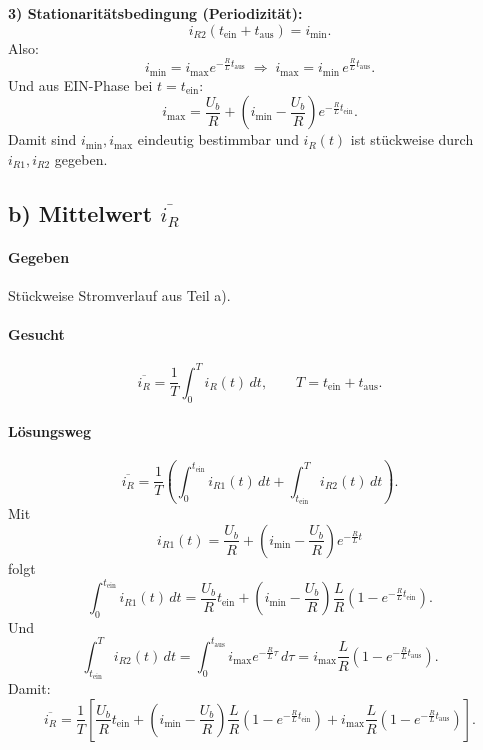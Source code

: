 \textbf{3) Stationaritätsbedingung (Periodizität):}
\[
i_{R2}(t_\mathrm{ein}+t_\mathrm{aus}) = i_\mathrm{min}.
\]
Also:
\[
i_\mathrm{min}=i_\mathrm{max}e^{-\frac{R}{L}t_\mathrm{aus}}
\;\Rightarrow\;
\boxed{
i_\mathrm{max}=i_\mathrm{min}\,e^{\frac{R}{L}t_\mathrm{aus}}
}.
\]
Und aus EIN-Phase bei $t=t_\mathrm{ein}$:
\[
i_\mathrm{max}=\frac{U_b}{R}+\left(i_\mathrm{min}-\frac{U_b}{R}\right)e^{-\frac{R}{L}t_\mathrm{ein}}.
\]
Damit sind $i_\mathrm{min},i_\mathrm{max}$ eindeutig bestimmbar und $i_R(t)$ ist stückweise durch $i_{R1},i_{R2}$ gegeben.


\subsection*{b) Mittelwert $\overline{i_R}$}

\paragraph{Gegeben}
Stückweise Stromverlauf aus Teil a).

\paragraph{Gesucht}
\[
\overline{i_R}=\frac{1}{T}\int_0^T i_R(t)\,dt, \qquad T=t_\mathrm{ein}+t_\mathrm{aus}.
\]

\paragraph{Lösungsweg}
\[
\overline{i_R}=\frac{1}{T}\left(
\int_0^{t_\mathrm{ein}} i_{R1}(t)\,dt + \int_{t_\mathrm{ein}}^{T} i_{R2}(t)\,dt
\right).
\]
Mit
\[
i_{R1}(t)=\frac{U_b}{R}+\left(i_\mathrm{min}-\frac{U_b}{R}\right)e^{-\frac{R}{L}t}
\]
folgt
\[
\int_0^{t_\mathrm{ein}} i_{R1}(t)\,dt
=
\frac{U_b}{R}t_\mathrm{ein}
+
\left(i_\mathrm{min}-\frac{U_b}{R}\right)\frac{L}{R}\left(1-e^{-\frac{R}{L}t_\mathrm{ein}}\right).
\]
Und
\[
\int_{t_\mathrm{ein}}^{T} i_{R2}(t)\,dt
=
\int_0^{t_\mathrm{aus}} i_\mathrm{max}e^{-\frac{R}{L}\tau}\,d\tau
=
i_\mathrm{max}\frac{L}{R}\left(1-e^{-\frac{R}{L}t_\mathrm{aus}}\right).
\]
Damit:
\[
\boxed{
\overline{i_R}=\frac{1}{T}\left[
\frac{U_b}{R}t_\mathrm{ein}
+
\left(i_\mathrm{min}-\frac{U_b}{R}\right)\frac{L}{R}\left(1-e^{-\frac{R}{L}t_\mathrm{ein}}\right)
+
i_\mathrm{max}\frac{L}{R}\left(1-e^{-\frac{R}{L}t_\mathrm{aus}}\right)
\right].
}
\]


